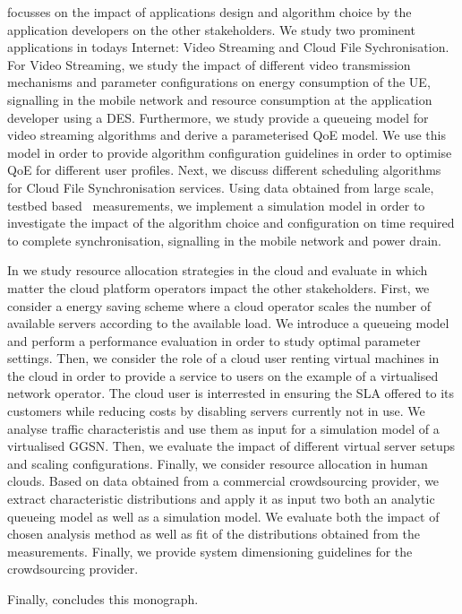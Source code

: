  focusses on the impact of applications design and algorithm choice by the application developers on the other stakeholders.
We study two prominent applications in todays Internet: Video Streaming and Cloud File Sychronisation.
For Video Streaming, we study the impact of different video transmission mechanisms and parameter configurations on energy consumption of the \gls{UE}, signalling in the mobile network and resource consumption at the application developer using a \gls{DES}.
Furthermore, we study provide a queueing model for video streaming algorithms and derive a parameterised \gls{QoE} model.
We use this model in order to provide algorithm configuration guidelines in order to optimise \gls{QoE} for different user profiles.
Next, we discuss different scheduling algorithms for Cloud File Synchronisation services.
Using data obtained from large scale, testbed based~\cite{PlanetLab} measurements, we implement a simulation model in order to investigate the impact of the algorithm choice and configuration on time required to complete synchronisation, signalling in the mobile network and power drain.  

In  we study resource allocation strategies in the cloud and evaluate in which matter the cloud platform operators impact the other stakeholders.
First, we consider a energy saving scheme where a cloud operator scales the number of available servers according to the available load.
We introduce a queueing model and perform a performance evaluation in order to study optimal parameter settings.
Then, we consider the role of a cloud user renting virtual machines in the cloud in order to provide a service to users on the example of a virtualised network operator.
The cloud user is interrested in ensuring the \gls{SLA} offered to its customers while reducing costs by disabling servers currently not in use.
We analyse traffic characteristis and use them as input for a simulation model of a virtualised \gls{GGSN}.
Then, we evaluate the impact of different virtual server setups and scaling configurations.
Finally, we consider resource allocation in human clouds.
Based on data obtained from a commercial crowdsourcing provider, we extract characteristic distributions and apply it as input two both an analytic queueing model as well as a simulation model.
We evaluate both the impact of chosen analysis method as well as fit of the distributions obtained from the measurements.
Finally, we provide system dimensioning guidelines for the crowdsourcing provider.

Finally,  concludes this monograph.